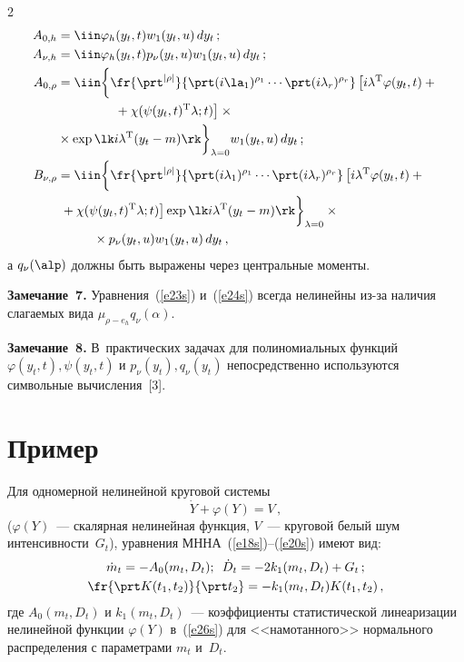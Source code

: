 \begin{multicols}{2}
\noindent
\begin{align*}
A_{0,h} &=\iin \varphi_h (y_t, t) w_1(y_t,u) \,d y_t\,;\\
A_{\nu,h} &=\iin \varphi_h (y_t, t)p_\nu (y_t,u) w_1(y_t,u)\, d y_t\,;\\
A_{0,\rho} &=\iin \biggl\{ \fr{\prt^{|\rho |}}{\prt (i\la_1)^{\rho_1} \cdots 
\prt ( i\lambda_r)^{\rho_r}} \left[ i\lambda^{\mathrm{T}} \varphi(y_t, t)+{}\right.\\
&\hspace*{15mm}\left.{}+
\chi(\psi (y_t, t)^{\mathrm{T}}\lambda;t)\right] \times{}\\
&{}\times \exp \lk i\lambda^{\mathrm{T}} (y_t-m)\rk \biggr\}_{\lambda=0}  w_1(y_t,u)\, d y_t\,;\\
B_{\nu,\rho} &=\iin \biggl\{ \fr{\prt^{|\rho |}}
{\prt (i\lambda_1)^{\rho_1} \cdots \prt ( i\lambda_r)^{\rho_r}} \left[ i\lambda^{\mathrm{T}} 
\varphi(y_t, t)+{}\right.\\
&\left.{}+\chi(\psi (y_t, t)^{\mathrm{T}}\lambda;t)\right ] 
\exp \lk i\lambda^{\mathrm{T}} (y_t-m)\rk \biggr\}_{\lambda=0}\times{}\\
&\hspace*{10mm}{}\times p_\nu (y_t,u)  
w_1(y_t,u)\, d y_t\,, %
\end{align*}
а  $q_\nu (\alp)$ должны быть выражены через центральные моменты.

\medskip

\noindent
\textbf{Замечание~7.} Уравнения~(\ref{e23s}) и~(\ref{e24s}) 
всегда нелинейны из-за наличия слагаемых вида $\mu_{\rho-e_h} q_\nu (\alpha)$.

\medskip

\noindent
\textbf{Замечание~8.} В~практических задачах для 
полиномиальных функций  $\varphi (y_t, t) , \psi(y_t, t)$ и  $p_\nu (y_t), q_\nu(y_t)$ 
непосредственно используются символьные вы\-чис\-ле\-ния~[3].


\section{Пример}

Для одномерной нелинейной круговой сис\-те\-мы
\begin{equation}
\dot Y +\varphi (Y)=V\,,\label{e26s}
\end{equation}
($\varphi (Y)$~--- скалярная нелинейная функция, $V$~--- круговой белый шум интенсивности~$G_t$), 
уравнения МННА~(\ref{e18s})--(\ref{e20s}) имеют вид:
\begin{gather*}
\dot m_t = - A_0 (m_t, D_t);\enskip \dot D_t =- 2 k_1 (m_t, D_t) + G_t\,;\\
\fr{\prt K(t_1, t_2)}{ \prt t_2} =- k_1 (m_t, D_t) K(t_1, t_2)\,,
\end{gather*}
где $A_0 (m_t, D_t)$ и $k_1 (m_t, D_t)$~--- 
коэффициенты статистической линеаризации нелинейной функции  $\varphi(Y)$ в~(\ref{e26s}) 
для <<намотанного>> нормального распределения с параметрами  $m_t$ и~$D_t$.


\end{multicols}
